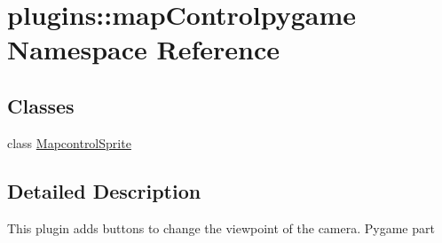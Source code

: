 \hypertarget{namespaceplugins_1_1map_controlpygame}{\section{plugins\-:\-:map\-Controlpygame \-Namespace \-Reference}
\label{namespaceplugins_1_1map_controlpygame}
}
\subsection*{\-Classes}
\begin{DoxyCompactItemize}
\item 
class \hyperlink{classplugins_1_1map_controlpygame_1_1_mapcontrol_sprite}{\-Mapcontrol\-Sprite}
\end{DoxyCompactItemize}


\subsection{\-Detailed \-Description}
\begin{DoxyVerb}
    This plugin adds buttons to change the viewpoint of the camera. Pygame part
\end{DoxyVerb}
 